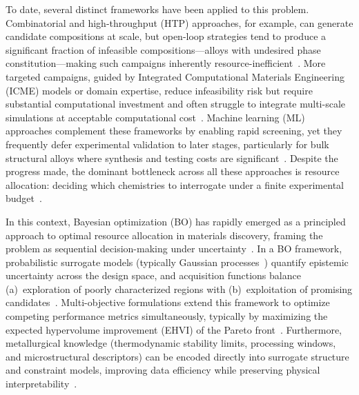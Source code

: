 
To date, several distinct frameworks have been applied to this problem. Combinatorial and high-throughput (HTP) approaches, for example, can generate candidate compositions at scale, but open-loop strategies tend to produce a significant fraction of infeasible compositions---alloys with undesired phase constitution---making such campaigns inherently resource-inefficient~\cite{potyrailo2011combinatorial, rajan2008combinatorial}. More targeted campaigns, guided by Integrated Computational Materials Engineering (ICME) models or domain expertise, reduce infeasibility risk but require substantial computational investment and often struggle to integrate multi-scale simulations at acceptable computational cost~\cite{national2008integrated, panchal2013key, arroyave2019systems}. Machine learning (ML) approaches complement these frameworks by enabling rapid screening, yet they frequently defer experimental validation to later stages, particularly for bulk structural alloys where synthesis and testing costs are significant~\cite{yang2022machine}. Despite the progress made, the dominant bottleneck across all these approaches is resource allocation: deciding which chemistries to interrogate under a finite experimental budget~\cite{arroyave2022perspective}.


In this context, Bayesian optimization (BO) has rapidly emerged as a principled approach to optimal resource allocation in materials discovery, framing the problem as sequential decision-making under uncertainty~\cite{shahriari2016taking, frazier2018tutorial}. In a BO framework, probabilistic surrogate models (typically Gaussian processes~\cite{Rasmussen:2005:GPM:1162254}) quantify epistemic uncertainty across the design space, and acquisition functions balance (a)~exploration of poorly characterized regions with (b)~exploitation of promising candidates~\cite{snoek2012practical, arroyave2022perspective}. Multi-objective formulations extend this framework to optimize competing performance metrics simultaneously, typically by maximizing the expected hypervolume improvement (EHVI) of the Pareto front~\cite{emmerich2006single, zhao2018fast, mamun2025accelerated, hanaoka2022comparison}. Furthermore, metallurgical knowledge (thermodynamic stability limits, processing windows, and microstructural descriptors) can be encoded directly into surrogate structure and constraint models, improving data efficiency while preserving physical interpretability~\cite{khatamsaz2022multiobjective, vela2023data, paramore2025twoshot}.

